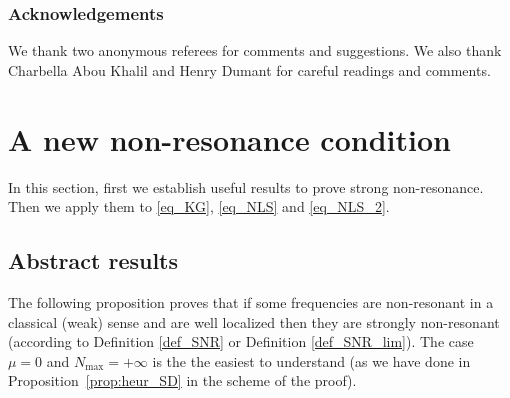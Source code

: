 \documentclass[JEP,XML,SOM,Unicode,NoEqCountersInSection,published]{cedram}
\theoremstyle{definition}
\begin{document}
\subsubsection*{Acknowledgements}
We thank two anonymous referees for comments and suggestions. We also thank Charbella Abou Khalil and Henry Dumant for careful readings and comments.

\section{A new non-resonance condition}
\label{sec_NR}

In this section, first we establish useful results to prove strong non-resonance. Then we apply them to \eqref{eq_KG}, \eqref{eq_NLS} and \eqref{eq_NLS_2}.

\subsection{Abstract results}
The following proposition proves that if some frequencies are non-resonant in a classical (weak) sense and are well localized then they are strongly non-resonant (according to Definition \ref{def_SNR} or Definition \ref{def_SNR_lim}). The case $\mu=0$ and $N_{\max}=+\infty$ is the the easiest to understand (as we have done in Proposition~\ref{prop:heur_SD} in the scheme of the proof).
\end{document}
